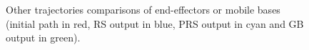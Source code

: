 \documentclass{tADR2e}
\begin{document}
\begin{figure}
{		\label{fig:trajectoriesbis:kitchen2}
	}
  \caption{Other trajectories comparisons of end-effectors or mobile bases (initial path in red, RS output in blue, PRS output in cyan and GB output in green).}
  \label{fig:trajectoriesbis}
\end{figure}
\end{document}
